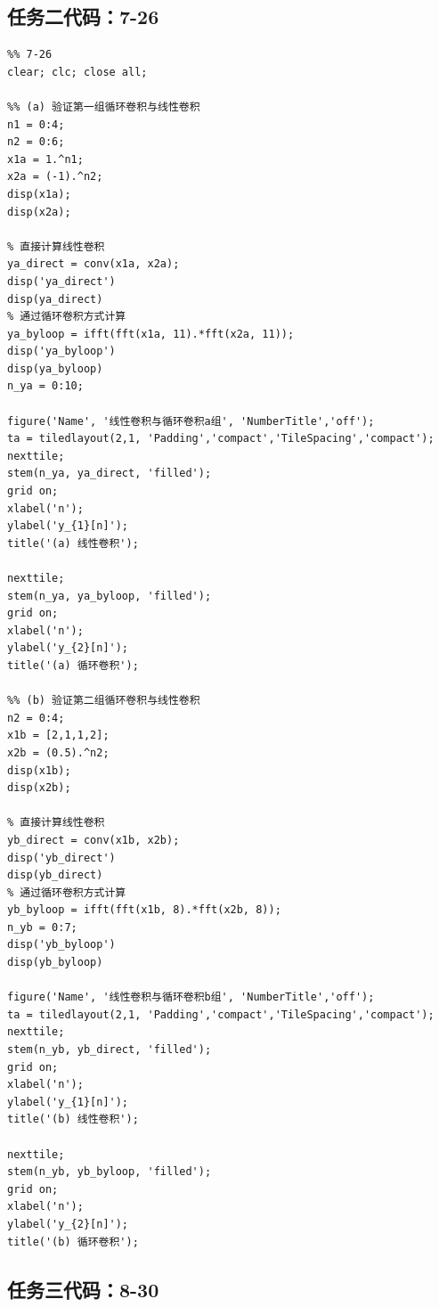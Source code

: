 \documentclass[UTF8,12pt,a4paper]{ctexart}
\begin{document}
\subsection{任务二代码：7-26}

\begin{lstlisting}
%% 7-26
clear; clc; close all;

%% (a) 验证第一组循环卷积与线性卷积
n1 = 0:4;
n2 = 0:6;
x1a = 1.^n1;
x2a = (-1).^n2;
disp(x1a);
disp(x2a);

% 直接计算线性卷积
ya_direct = conv(x1a, x2a);
disp('ya_direct')
disp(ya_direct)
% 通过循环卷积方式计算
ya_byloop = ifft(fft(x1a, 11).*fft(x2a, 11));
disp('ya_byloop')
disp(ya_byloop)
n_ya = 0:10;

figure('Name', '线性卷积与循环卷积a组', 'NumberTitle','off');
ta = tiledlayout(2,1, 'Padding','compact','TileSpacing','compact');
nexttile;
stem(n_ya, ya_direct, 'filled');
grid on;
xlabel('n'); 
ylabel('y_{1}[n]');
title('(a) 线性卷积');

nexttile;
stem(n_ya, ya_byloop, 'filled');
grid on;
xlabel('n'); 
ylabel('y_{2}[n]');
title('(a) 循环卷积');

%% (b) 验证第二组循环卷积与线性卷积
n2 = 0:4;
x1b = [2,1,1,2];
x2b = (0.5).^n2;
disp(x1b);
disp(x2b);

% 直接计算线性卷积 
yb_direct = conv(x1b, x2b);
disp('yb_direct')
disp(yb_direct)
% 通过循环卷积方式计算
yb_byloop = ifft(fft(x1b, 8).*fft(x2b, 8));
n_yb = 0:7;
disp('yb_byloop')
disp(yb_byloop)

figure('Name', '线性卷积与循环卷积b组', 'NumberTitle','off');
ta = tiledlayout(2,1, 'Padding','compact','TileSpacing','compact');
nexttile;
stem(n_yb, yb_direct, 'filled');
grid on;
xlabel('n'); 
ylabel('y_{1}[n]');
title('(b) 线性卷积');

nexttile;
stem(n_yb, yb_byloop, 'filled');
grid on;
xlabel('n'); 
ylabel('y_{2}[n]');
title('(b) 循环卷积');
\end{lstlisting}

\subsection{任务三代码：8-30}
\end{document}
